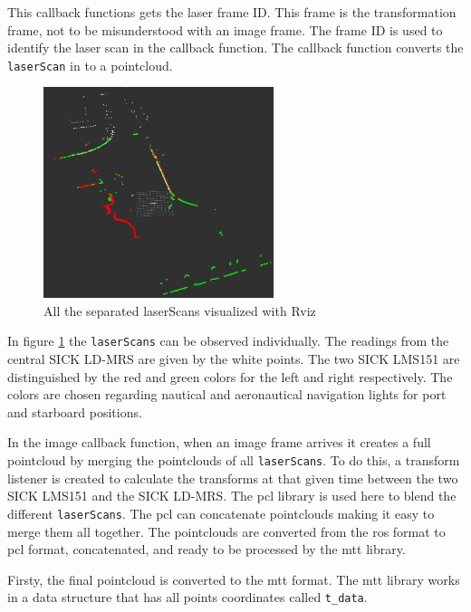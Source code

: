 This callback functions gets the laser frame ID. This frame is the transformation frame, not to be misunderstood with an image frame. The frame ID is used to identify the laser scan in the callback function. The callback function converts the \texttt{laserScan} in to a pointcloud.

\begin{figure}[htp]
	
	\centering
	\includegraphics[width=0.6\textwidth]{caplabel/imgs/rviz0.png}
	
	\caption{All the separated laserScans visualized with Rviz}
	\label{fig:rviz0}
	
\end{figure}

In figure \ref{fig:rviz0} the \texttt{laserScans} can be observed individually. The readings from the central SICK LD-MRS are given by the white points. The two SICK LMS151 are distinguished by the red and green colors for the left and right respectively. The colors are chosen regarding nautical and aeronautical navigation lights for port and starboard positions.

In the image callback function, when an image frame arrives it creates a full pointcloud by merging the pointclouds of all \texttt{laserScans}. To do this, a transform listener is created to calculate the transforms at that given time between the two SICK LMS151 and the SICK LD-MRS. The \gls{pcl} library is used here to blend the different \texttt{laserScans}. The \gls{pcl} can concatenate pointclouds making it easy to merge them all together. The pointclouds are converted from the \gls{ros} format to \gls{pcl} format, concatenated, and ready to be processed by the \gls{mtt} library. 

Firsty, the final pointcloud is converted to the \gls{mtt} format. The \gls{mtt} library works in a data structure that has all points coordinates called \texttt{t\_data}.

